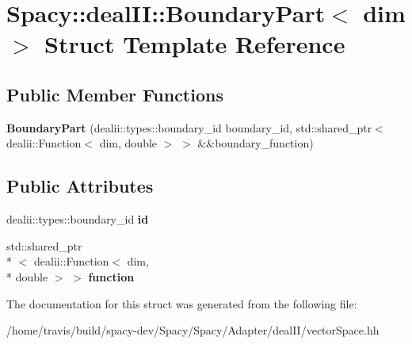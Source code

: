 \hypertarget{structSpacy_1_1dealII_1_1BoundaryPart}{\section{Spacy\-:\-:deal\-I\-I\-:\-:Boundary\-Part$<$ dim $>$ Struct Template Reference}
\label{structSpacy_1_1dealII_1_1BoundaryPart}
}
\subsection*{Public Member Functions}
\begin{DoxyCompactItemize}
\item 
\hypertarget{structSpacy_1_1dealII_1_1BoundaryPart_ad2f5c0a39760a8b0c5d509e9bd31ae89}{{\bfseries Boundary\-Part} (dealii\-::types\-::boundary\-\_\-id boundary\-\_\-id, std\-::shared\-\_\-ptr$<$ dealii\-::\-Function$<$ dim, double $>$ $>$ \&\&boundary\-\_\-function)}\label{structSpacy_1_1dealII_1_1BoundaryPart_ad2f5c0a39760a8b0c5d509e9bd31ae89}

\end{DoxyCompactItemize}
\subsection*{Public Attributes}
\begin{DoxyCompactItemize}
\item 
\hypertarget{structSpacy_1_1dealII_1_1BoundaryPart_a70eafe6348de871fa5d36d602ff89612}{dealii\-::types\-::boundary\-\_\-id {\bfseries id}}\label{structSpacy_1_1dealII_1_1BoundaryPart_a70eafe6348de871fa5d36d602ff89612}

\item 
\hypertarget{structSpacy_1_1dealII_1_1BoundaryPart_af80025a88e1e848218ee20016b2df0d8}{std\-::shared\-\_\-ptr\\*
$<$ dealii\-::\-Function$<$ dim, \\*
double $>$ $>$ {\bfseries function}}\label{structSpacy_1_1dealII_1_1BoundaryPart_af80025a88e1e848218ee20016b2df0d8}

\end{DoxyCompactItemize}


The documentation for this struct was generated from the following file\-:\begin{DoxyCompactItemize}
\item 
/home/travis/build/spacy-\/dev/\-Spacy/\-Spacy/\-Adapter/deal\-I\-I/vector\-Space.\-hh\end{DoxyCompactItemize}
